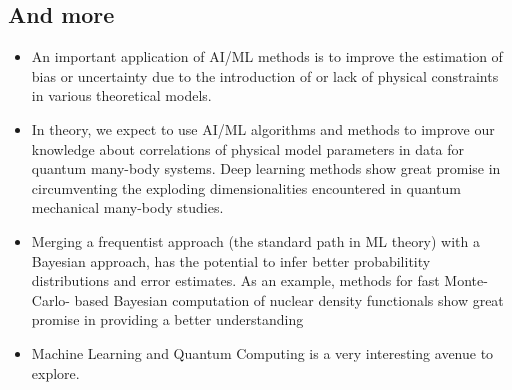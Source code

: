 \documentclass[%
oneside,                 %
final,                   %
10pt]{article}
\begin{document}
\subsection{And more}

\begin{block}{}
\begin{itemize}
\item An important application of AI/ML methods is to improve the estimation of bias or uncertainty due to the introduction of or lack of physical constraints in various theoretical models.

\item In theory, we expect to use AI/ML algorithms and methods to improve our knowledge about  correlations of physical model parameters in data for quantum many-body systems. Deep learning methods show great promise in circumventing the exploding dimensionalities encountered in quantum mechanical many-body studies. 

\item Merging a frequentist approach (the standard path in ML theory) with a Bayesian approach, has the potential to infer better probabilitity distributions and error estimates. As an example, methods for fast Monte-Carlo- based Bayesian computation of nuclear density functionals show great promise in providing a better understanding 

\item Machine Learning and Quantum Computing is a very interesting avenue to explore. 
\end{itemize}

\noindent
\end{block}

\end{document}
